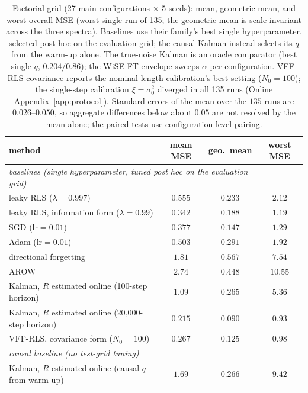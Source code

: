 \documentclass[twoside,11pt]{article}
\begin{document}
\begin{table}[t]
\centering
\footnotesize
\setlength{\tabcolsep}{4pt}
\renewcommand{\arraystretch}{0.92}
\caption{Factorial grid (27 main configurations $\times$ 5 seeds): mean, geometric-mean, and worst overall MSE (worst single run of 135; the geometric mean is scale-invariant across the three spectra).
Baselines use their family's best single hyperparameter, selected post hoc on the evaluation grid; the causal Kalman instead selects its $q$ from the warm-up alone.
The true-noise Kalman is an oracle comparator (best single $q$, $0.204/0.86$); the WiSE-FT envelope sweeps $\alpha$ per configuration.
VFF-RLS covariance reports the nominal-length calibration's best setting ($N_0 = 100$); the single-step calibration $\xi = \sigma_0^2$ diverged in all 135 runs (Online Appendix~\ref{app:protocol}).
Standard errors of the mean over the $135$ runs are $0.026$--$0.050$, so aggregate differences below about $0.05$ are not resolved by the mean alone; the paired tests use configuration-level pairing.}
\label{tab:grid}
\setlength{\tabcolsep}{3pt}
\begin{tabular}{lccc}
\toprule
method & mean MSE & geo.\ mean & worst MSE \\
\midrule
\multicolumn{3}{l}{\emph{baselines (single hyperparameter, tuned post hoc on the evaluation grid)}}\\
leaky RLS ($\lambda = 0.997$) & $0.555$ & $0.233$ & $2.12$ \\
leaky RLS, information form ($\lambda = 0.99$) & $0.342$ & $0.188$ & $1.19$ \\
SGD ($\mathrm{lr} = 0.01$) & $0.377$ & $0.147$ & $1.29$ \\
Adam \citep{kingma2015adam} ($\mathrm{lr} = 0.01$) & $0.503$ & $0.291$ & $1.92$ \\
directional forgetting & $1.81$ & $0.567$ & $7.54$ \\
AROW & $2.74$ & $0.448$ & $10.55$ \\
Kalman, $R$ estimated online (100-step horizon) & $1.09$ & $0.265$ & $5.36$ \\
Kalman, $R$ estimated online (20{,}000-step horizon) & $0.215$ & $0.090$ & $0.93$ \\
VFF-RLS, covariance form ($N_0 = 100$) \citep{fortescue1981} & $0.267$ & $0.125$ & $0.98$ \\
\multicolumn{3}{l}{\emph{causal baseline (no test-grid tuning)}}\\
Kalman, $R$ estimated online (causal $q$ from warm-up) & $1.69$ & $0.266$ & $9.42$ \\

\end{tabular}
\end{table}
\end{document}
